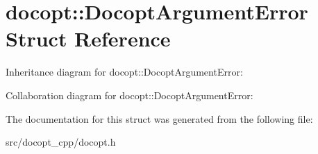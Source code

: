 \hypertarget{structdocopt_1_1DocoptArgumentError}{}\section{docopt\+:\+:Docopt\+Argument\+Error Struct Reference}
\label{structdocopt_1_1DocoptArgumentError}


Inheritance diagram for docopt\+:\+:Docopt\+Argument\+Error\+:


Collaboration diagram for docopt\+:\+:Docopt\+Argument\+Error\+:


The documentation for this struct was generated from the following file\+:\begin{DoxyCompactItemize}
\item 
src/docopt\+\_\+cpp/docopt.\+h\end{DoxyCompactItemize}
